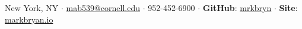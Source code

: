 {
\small \noindent
\centering
New York, NY
$\cdot$
\href{mailto:mab539@cornell.edu}{mab539@cornell.edu}
$\cdot$
952-452-6900
$\cdot$
{\bfseries\small GitHub}: \href{https://github.com/mrkbryn}{mrkbryn}
$\cdot$
{\bfseries\small Site}: \href{http://markbryan.io}{markbryan.io}
\hfill

}
